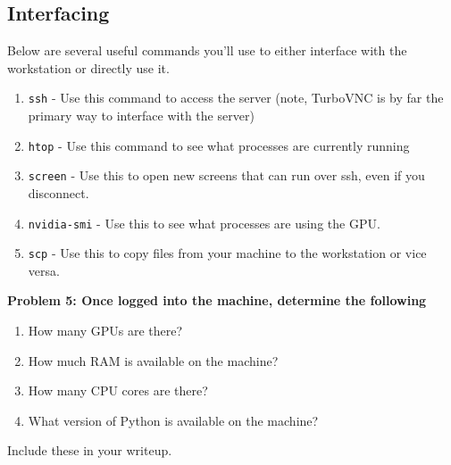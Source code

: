 \subsection*{Interfacing}
Below are several useful commands you'll use to either interface with the workstation or directly use it.
\begin{enumerate}
    \item \texttt{ssh} - Use this command to access the server (note, TurboVNC is by far the primary way to interface with the server)
	\item \texttt{htop} - Use this command to see what processes are currently running
	\item \texttt{screen} - Use this to open new screens that can run over ssh, even if you disconnect.
	\item \texttt{nvidia-smi} - Use this to see what processes are using the GPU.
    \item \texttt{scp} - Use this to copy files from your machine to the workstation or vice versa.
\end{enumerate}

{\bf Problem 5: Once logged into the machine, determine the following
\begin{enumerate}[label=(\alph*)]
    \item How many GPUs are there?
    \item How much RAM is available on the machine?
    \item How many CPU cores are there?
    \item What version of Python is available on the machine?
\end{enumerate}
Include these in your writeup.}